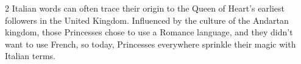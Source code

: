 \begin{multicols}{2}
Italian words can often trace their origin to the Queen of Heart's earliest followers in the United Kingdom. Influenced by the culture of the Andartan kingdom, those Princesses chose to use a Romance language, and they didn't want to use French, so today, Princesses everywhere sprinkle their magic with Italian terms. 


\end{multicols}
